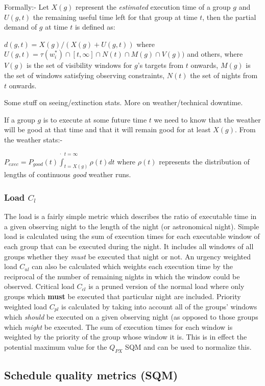 Formally:- Let $X(g)$ represent the \emph{estimated} execution time of a group $g$ and $U(g,t)$ the remaining useful time left for that group at time $t$, then the partial demand of $g$ at time $t$ is defined as:

$d(g,t) = X(g)/(X(g) + U(g,t))$ where $U(g,t) = \tau(w^*_i) \cap [t,\infty] \cap N(t) \cap M(g) \cap V(g))$ and others, where $V(g)$ is the set of visibility windows for $g$'s targets from $t$ onwards, $M(g)$ is the set of windows satisfying observing constraints, $N(t)$ the set of nights from $t$ onwards.

Some stuff on seeing/extinction stats. More on weather/technical downtime.

If a group $g$ is to execute at some future time $t$ we need to know that the weather will be good at that time and that it will remain good for at least $X(g)$. From the weather stats:- 

$P_{exec}=P_{good}(t) \dot \int_{t=X(g)}^{t=\infty}{\rho(t)dt}$ where $\rho(t)$ represents the distribution of lengths of continuous \emph{good} weather runs.

\subsubsection{Load $C_l$}
The load is a fairly simple metric which describes the ratio of executable time in a given observing night to the length of the night (or astronomical night). Simple load is calculated using the sum of execution times for each executable window of each group that can be executed during the night. It includes all windows of all groups whether they \emph{must} be executed that night or not. An urgency weighted load $C_{ul}$ can also be calculated which weights each execution time by the reciprocal of the number of remaining nights in which the window could be observed. Critical load $C_{cl}$ is a pruned version of the normal load where only groups which {\bf must} be executed that particular night are included. Priority weighted load $C_{pl}$ is calculated by taking into account all of the groups' windows which \emph{should} be executed on a given observing night (as opposed to those groups which \emph{might} be executed. The sum of execution times for each window is weighted by the priority of the group whose window it is. This is in effect the potential maximum value for the $Q_{PX}$ SQM and can be used to normalize this.

\subsection{Schedule quality metrics (SQM)}


